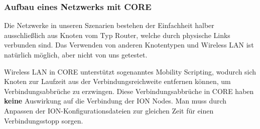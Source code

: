 \documentclass{article}
\begin{document}
\subsubsection{Aufbau eines Netzwerks mit CORE}
Die Netzwerke in unseren Szenarien bestehen der Einfachheit halber ausschließlich aus Knoten vom Typ Router, welche durch physische Links verbunden sind. Das Verwenden von anderen Knotentypen und Wireless LAN ist natürlich möglich, aber nicht von uns getestet.\par
Wireless LAN in CORE unterstützt sogenanntes Mobility Scripting, wodurch sich Knoten zur Laufzeit aus der Verbindungsreichweite entfernen können, um Verbindungsabbrüche zu erzwingen. Diese Verbindungsabbrüche in CORE haben \textbf{keine} Auswirkung auf die Verbindung der ION Nodes. Man muss durch Anpassen der ION-Konfigurationsdateien zur gleichen Zeit für einen Verbindungsstopp sorgen.
\end{document}
